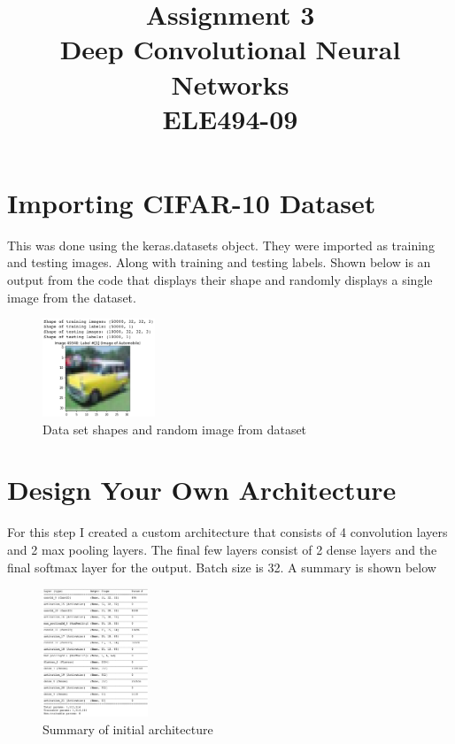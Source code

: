 \documentclass[conference]{IEEEtran}
\begin{document}
 
    \title{
        Assignment 3\\[0.3cm]
        \large  Deep Convolutional Neural Networks\\
        ELE494-09
    }

    \author{
    }

    \maketitle

    \section{Importing CIFAR-10 Dataset}

    This was done using the keras.datasets object. They were imported as
    training and testing images. Along with training and testing labels.
    Shown below is an output from the code that displays their shape and randomly
    displays a single image from the dataset.

    \begin{figure}[H]
        \centering
        \captionsetup{justification=centering}
        \centering
            \includegraphics[width=0.3\textwidth]{1.png}
            \caption{Data set shapes and random image from dataset}
    \end{figure}


    \section{Design Your Own Architecture}

    For this step I created a custom architecture that consists of 4 convolution
    layers and 2 max pooling layers. The final few layers consist of 2 dense layers
    and the final softmax layer for the output. Batch size is 32. A summary is shown below
    
    \begin{figure}[H]
        \centering
        \captionsetup{justification=centering}
        \centering
            \includegraphics[width=0.28\textwidth]{2.png}
            \caption{Summary of initial architecture}
    \end{figure}
\end{document}

